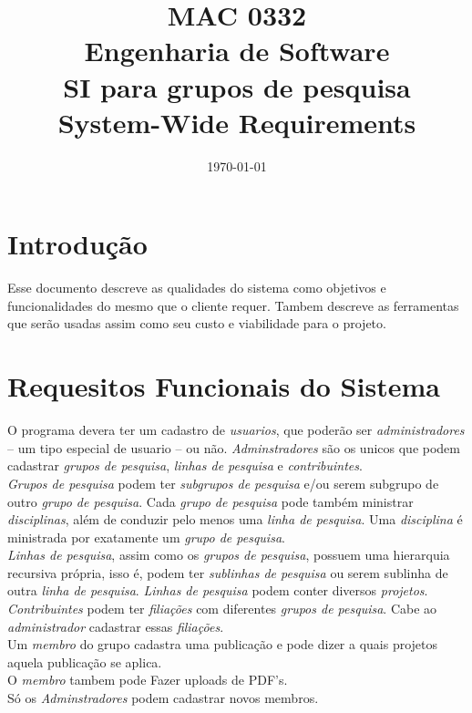 \documentclass[11pt, a4paper]{article}
\title{MAC 0332\\
	Engenharia de Software\\
	SI para grupos de pesquisa\\
	System-Wide Requirements}
\date{\today}
\begin{document}
	\maketitle
	\newpage
	
	\section{Introdução}
		Esse documento descreve as qualidades do sistema como objetivos e 
		funcionalidades do mesmo que o cliente requer. Tambem descreve as 
		ferramentas que serão usadas assim como seu custo e viabilidade para 
		o projeto. 
	\section{Requesitos Funcionais do Sistema}
		O programa devera ter um cadastro de \textit{usuarios}, que poderão ser 
		\textit{administradores} -- um tipo especial de usuario -- ou não.
		\textit{Adminstradores} são os unicos que podem cadastrar 
		\textit{grupos de pesquisa}, \textit{linhas de pesquisa} e
		\textit{contribuintes}.\\
		\indent \textit{Grupos de pesquisa} podem ter \textit{subgrupos de pesquisa}
		e/ou serem subgrupo de outro \textit{grupo de pesquisa}. Cada
		\textit{grupo de pesquisa} pode também ministrar \textit{disciplinas}, além de
		conduzir pelo menos uma \textit{linha de pesquisa}. Uma \textit{disciplina} é
		ministrada por exatamente um \textit{grupo de pesquisa}.\\
		\indent \textit{Linhas de pesquisa}, assim como os \textit{grupos de pesquisa},
		possuem uma hierarquia recursiva própria, isso é, podem ter
		\textit{sublinhas de pesquisa} ou serem sublinha de outra \textit{linha de pesquisa}.
		\textit{Linhas de pesquisa} podem conter diversos \textit{projetos}.\\
		\indent \textit{Contribuintes} podem ter \textit{filiações} com diferentes
		\textit{grupos de pesquisa}. Cabe ao \textit{administrador} cadastrar essas
		\textit{filiações}.\\
		\indent Um \textit{membro} do grupo cadastra uma publicação e pode 
		dizer a quais projetos aquela publicação se aplica.\\
		\indent O \textit{membro} tambem pode Fazer uploads de PDF's.\\
		\indent Só os \textit{Adminstradores} podem cadastrar novos membros.
		
\end{document}
